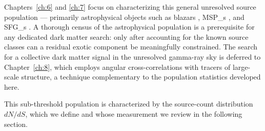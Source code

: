 Chapters~\ref{ch:6} and \ref{ch:7} focus on characterizing this general unresolved source population --- primarily astrophysical objects such as blazars \cite{Ajello:2015mfa,DiMauro:2017ing}, \glspl{MSP_} \cite{Manconi:2019ynl}, and \glspl{SFG_} \cite{Linden:2016fdd}.
A thorough census of the astrophysical population is a prerequisite for any dedicated dark matter search: only after accounting for the known source classes can a residual exotic component be meaningfully constrained.
The search for a collective dark matter signal in the unresolved gamma-ray sky is deferred to Chapter~\ref{ch:8}, which employs angular cross-correlations with tracers of large-scale structure, a technique complementary to the population statistics developed here.

This sub-threshold population is characterized by the source-count distribution $dN/dS$, which we define and whose measurement we review in the following section.
